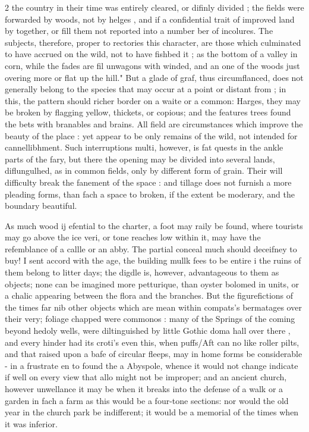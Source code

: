 \documentclass[10pt]{article}
\begin{document}
\begin{multicols}{2}\raggedcolumns
the country in their time was entirely cleared, or difinly divided ; the fields were forwarded by woods, not by helges , and if a confidential trait of improved land by together, or fill them not reported into a number ber of incolures. The subjects, therefore, proper to rectories this character, are those which culminated to have accrued on the wild, not to have fishbed it ; as the bottom of a valley in corn, while the fades are fil unwagons with winded, and an one of the woods just overing more or flat up the hill." But a glade of graf, thus circumflanced, does not generally belong to the species that may occur at a point or distant from ; in this, the pattern should richer border on a waite or a common: Harges, they may be broken by flagging yellow, thickets, or copious; and the features trees found the bets with branables and brains. All field are circumstances which improve the beauty of the place : yet appear to be only remains of the wild, not intended for cannellibhment. Such interruptions multi, however, is fat quests in the ankle parts of the fary, but there the opening may be divided into several lands, diflungulhed, as in common fields, only by different form of grain. Their will difficulty break the fanement of the space : and tillage does not furnish a more pleading forms, than fach a space to broken, if the extent be moderary, and the boundary beautiful.

As much wood ij efential to the charter, a foot may raily be found, where tourists may go above the ice veri, or tone reaches low within it, may have the refemblance of a callle or an abby. The partial conceal much should deceifney to buy! I sent accord with the age, the building mullk fees to be entire i the ruins of them belong to litter days; the digdle is, however, advantageous to them as objects; none can be imagined more petturique, than oyster bolomed in units, or a chalic appearing between the flora and the branches. But the figurefictions of the times far nib other objects which are mean within compats’s bermatages over their very; foliage chapped were commonos : many of the Springs of the coming beyond hedoly wells, were diltinguished by little Gothic doma hall over there , and every hinder had its croti's even this, when puffs/Aft can no like roller pilts, and that raised upon a bafe of circular fleeps, may in home forms be considerable - in a frustrate en to found the a Abyspole, whence it would not change indicate if well on every view that allo might not be improper; and an ancient church, however unwellance it may be when it breaks into the defense of a walk or a garden in fach a farm as this would be a four-tone sections: nor would the old year in the church park be indifferent; it would be a memorial of the times when it was inferior.


\end{multicols}
\end{document}
